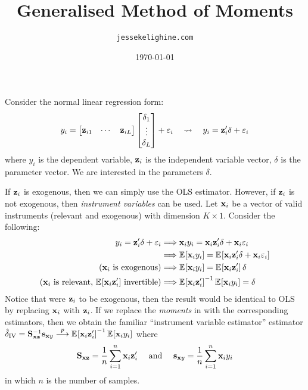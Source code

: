 \documentclass{article}
\title{Generalised Method of Moments}
\author{\texttt{jessekelighine.com}}
\date{\today}
\begin{document}
\maketitle

\noindent
Consider the normal linear regression form:
\begin{align}\label{true_model}
	y_i =
	\begin{bmatrix}
		\mathbf{z}_{i1} & \cdots & \mathbf{z}_{iL}
	\end{bmatrix}
	\begin{bmatrix}
		\delta_1\\\vdots\\\delta_L
	\end{bmatrix}
	+ \varepsilon_i
	\quad\leadsto\quad
	y_i = \mathbf{z}_i'\delta + \varepsilon_i
\end{align}
where
$y_i$ is the dependent variable,
$\mathbf{z}_i$ is the independent variable vector,
$\delta$ is the parameter vector.
We are interested in the parameters $\delta$.

If $\mathbf{z}_i$ is exogenous, then we can simply use the OLS estimator.
However, if $\mathbf{z}_i$ is not exogenous,
then \emph{instrument variables} can be used.
Let $\mathbf{x}_i$ be a vector of valid instruments (relevant and exogenous) with dimension $K\times1$.
Consider the following:
\begin{align}
	y_i = \mathbf{z}_i'\delta + \varepsilon_i
	&\Longrightarrow \mathbf{x}_i y_i = \mathbf{x}_i \mathbf{z}_i' \delta + \mathbf{x}_i \varepsilon_i \\
	&\Longrightarrow \operatorname{\mathbb{E}}_{}\!\left[\mathbf{x}_i y_i\right] = \operatorname{\mathbb{E}}_{}\!\left[\mathbf{x}_i \mathbf{z}_i' \delta + \mathbf{x}_i \varepsilon_i\right] \\
	\text{($\mathbf{x}_i$ is exogenous)}
	&\Longrightarrow \operatorname{\mathbb{E}}_{}\!\left[\mathbf{x}_i y_i\right] = \operatorname{\mathbb{E}}_{}\!\left[\mathbf{x}_i \mathbf{z}_i'\right]\delta \label{motif} \\
	\text{($\mathbf{x}_i$ is relevant, $\operatorname{\mathbb{E}}_{}\!\left[\mathbf{x}_i\mathbf{z}_i'\right]$ invertible)}
	&\Longrightarrow \operatorname{\mathbb{E}}_{}\!\left[\mathbf{x}_i\mathbf{z}_i'\right]^{-1}\operatorname{\mathbb{E}}_{}\!\left[\mathbf{x}_i y_i\right] = \delta \label{IV}
\end{align}
Notice that were $\mathbf{z}_i$ to be exogenous,
then the result would be identical to OLS by replacing $\mathbf{x}_i$ with $\mathbf{z}_i$.
If we replace the \emph{moments} in  with the corresponding estimators,
then we obtain the familiar ``instrument variable estimator''
estimator $\hat\delta_{\text{IV}}=\mathbf{S}_{\mathbf{x}\mathbf{z}}^{-1}\mathbf{s}_{\mathbf{x} y}\overset{p}{\longrightarrow}\operatorname{\mathbb{E}}_{}\!\left[\mathbf{x}_i\mathbf{z}_i'\right]^{-1}\operatorname{\mathbb{E}}_{}\!\left[\mathbf{x}_i y_i\right]$ where
\begin{align*}
	\mathbf{S}_{\mathbf{x}\mathbf{z}} = \frac1n\sum_{i=1}^{n} \mathbf{x}_i\mathbf{z}_i' \quad\text{ and }\quad
	\mathbf{s}_{\mathbf{x} y} = \frac1n\sum_{i=1}^{n} \mathbf{x}_iy_i
\end{align*}
in which $n$ is the number of samples.
\end{document}
